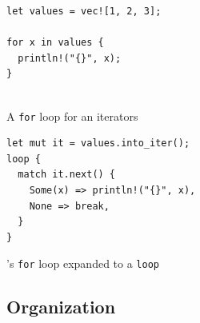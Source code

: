 
\begin{listing}[!h]
 \begin{minipage}{0.45\textwidth}
\begin{listing}[H]
  \begin{verbatim}
let values = vec![1, 2, 3];

for x in values {
  println!("{}", x);
}


\end{verbatim}
\caption{A \texttt{for} loop for an iterators}
\label{lst:rust:for}
\end{listing}
 \end{minipage}
 \begin{minipage}{0.45\textwidth}
  \begin{listing}[H]
    \begin{verbatim}
let mut it = values.into_iter();
loop {
  match it.next() {
    Some(x) => println!("{}", x),
    None => break,
  }
}
    \end{verbatim}
    \caption{\rust's \texttt{for} loop expanded to a \texttt{loop}}
    \label{lst:rust:desugared-for}
  \end{listing}
 \end{minipage}
\end{listing}




\subsection{Organization}
\label{ssub:rust:organization}

